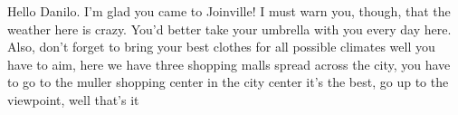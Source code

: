 \documentclass{article}
\begin{document}
Hello Danilo. I'm glad you came to Joinville! I must warn you, though, that the weather here is crazy. You'd better take your umbrella with you every day here. Also, don't forget to bring your best clothes for all possible climates
well you have to aim, here we have three shopping malls spread across the city, you have to go to the muller shopping center in the city center it's the best, go up to the viewpoint, well that's it
\end{document}
